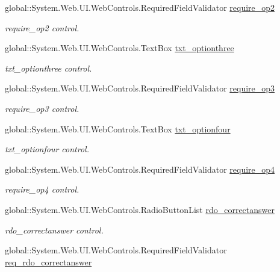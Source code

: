 \begin{DoxyCompactItemize}
global\+::\+System.\+Web.\+U\+I.\+Web\+Controls.\+Required\+Field\+Validator \mbox{\hyperlink{class_admin__addquestion_a3b8fcb44eba610c695289b5d38eac586}{require\+\_\+op2}}
\begin{DoxyCompactList}\small\item\em require\+\_\+op2 control. \end{DoxyCompactList}\item 
global\+::\+System.\+Web.\+U\+I.\+Web\+Controls.\+Text\+Box \mbox{\hyperlink{class_admin__addquestion_a2898d0b950e799a92fa0bd1840a28486}{txt\+\_\+optionthree}}
\begin{DoxyCompactList}\small\item\em txt\+\_\+optionthree control. \end{DoxyCompactList}\item 
global\+::\+System.\+Web.\+U\+I.\+Web\+Controls.\+Required\+Field\+Validator \mbox{\hyperlink{class_admin__addquestion_ac829cee27f2d3e22dac9b1a4e4598fb3}{require\+\_\+op3}}
\begin{DoxyCompactList}\small\item\em require\+\_\+op3 control. \end{DoxyCompactList}\item 
global\+::\+System.\+Web.\+U\+I.\+Web\+Controls.\+Text\+Box \mbox{\hyperlink{class_admin__addquestion_a4332d10640f98e6ca634f96d59d15954}{txt\+\_\+optionfour}}
\begin{DoxyCompactList}\small\item\em txt\+\_\+optionfour control. \end{DoxyCompactList}\item 
global\+::\+System.\+Web.\+U\+I.\+Web\+Controls.\+Required\+Field\+Validator \mbox{\hyperlink{class_admin__addquestion_a672678540345fb6f5632b897083a2c27}{require\+\_\+op4}}
\begin{DoxyCompactList}\small\item\em require\+\_\+op4 control. \end{DoxyCompactList}\item 
global\+::\+System.\+Web.\+U\+I.\+Web\+Controls.\+Radio\+Button\+List \mbox{\hyperlink{class_admin__addquestion_a255482c92326bf804f50312d380bd982}{rdo\+\_\+correctanswer}}
\begin{DoxyCompactList}\small\item\em rdo\+\_\+correctanswer control. \end{DoxyCompactList}\item 
global\+::\+System.\+Web.\+U\+I.\+Web\+Controls.\+Required\+Field\+Validator \mbox{\hyperlink{class_admin__addquestion_ad956413c12ca17179e824c18fe8c88b5}{req\+\_\+rdo\+\_\+correctanswer}}

\end{DoxyCompactItemize}
